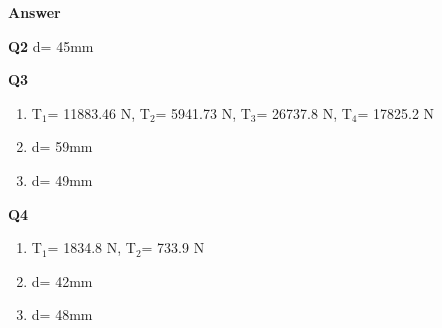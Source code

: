 \documentclass[a4paper, fleqn]{article}
\begin{document}
\newpage

\textbf{Answer}

\textbf{Q2}
d= 45mm

\textbf{Q3}

\begin{enumerate}[label=(\roman*)]
    \item T$_1$= 11883.46 N, T$_2$= 5941.73 N, T$_3$= 26737.8 N, T$_4$= 17825.2 N
    \item d= 59mm
    \item d= 49mm
\end{enumerate}

\textbf{Q4}
\begin{enumerate}[label=(\roman*)]
    \item T$_1$= 1834.8 N, T$_2$= 733.9 N
    \item d= 42mm
    \item d= 48mm
    \end{enumerate}
\end{document}
